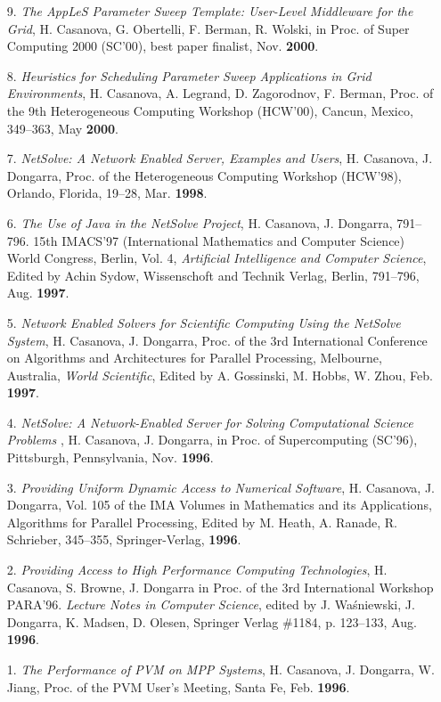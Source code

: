 \begin{enumerate}
\item[9.]
{\it The AppLeS Parameter Sweep Template: User-Level Middleware for the
Grid}, H. Casanova, G. Obertelli, F. Berman, R. Wolski, in Proc.
of Super Computing 2000 (SC'00), best paper finalist, Nov. {\bf 2000}.

\item [8.]
{\it Heuristics for Scheduling Parameter Sweep Applications in Grid
Environments}, H. Casanova, A. Legrand, D. Zagorodnov, F. Berman,
Proc. of the 9th Heterogeneous Computing Workshop (HCW'00), Cancun,
Mexico, 349--363, May {\bf 2000}.

\item[7.]
{\it NetSolve: A Network Enabled Server, Examples and Users}, H. Casanova,
J. Dongarra, Proc. of the Heterogeneous Computing Workshop (HCW'98),
Orlando, Florida, 19--28, Mar. {\bf 1998}.

\item[6.]
{\it The Use of Java in the NetSolve Project}, H. Casanova, J. Dongarra,
791--796.  15th IMACS'97 (International Mathematics and Computer Science)
World Congress, Berlin, Vol. 4, \emph{Artificial Intelligence and Computer
Science}, Edited by Achin Sydow, Wissenschoft and Technik Verlag, Berlin,
791--796, Aug. {\bf 1997}.

\item[5.]
{\it Network Enabled Solvers for Scientific Computing Using the NetSolve
System}, H. Casanova, J. Dongarra, Proc. of the 3rd International
Conference on Algorithms and Architectures for Parallel Processing,
Melbourne, Australia, \emph{World Scientific}, Edited by A. Gossinski,
M. Hobbs, W. Zhou, Feb. {\bf 1997}.

\item[4.]
{\it NetSolve: A Network-Enabled Server for Solving Computational
Science Problems }, H. Casanova, J. Dongarra, in Proc.
of Supercomputing (SC'96), Pittsburgh, Pennsylvania, Nov. {\bf 1996}.


\item[3.]
{\it Providing Uniform Dynamic Access to Numerical Software}, H. Casanova,
J. Dongarra, Vol. 105 of the IMA Volumes in Mathematics and its
Applications, Algorithms for Parallel Processing, Edited by M. Heath,
A. Ranade, R. Schrieber, 345--355, Springer-Verlag, {\bf 1996}.

\item[2.]
{\it Providing Access to High Performance Computing Technologies},
H. Casanova, S. Browne, J. Dongarra in Proc. of the 3rd
International Workshop PARA'96. \emph{Lecture Notes in Computer Science},
edited by J. Wa\'sniewski, J. Dongarra, K. Madsen, D. Olesen, Springer
Verlag \#1184, p. 123--133, Aug. {\bf 1996}.

\item[1.]
{\it The Performance of PVM on MPP Systems}, H. Casanova, J. Dongarra,
W. Jiang, Proc. of the PVM User's Meeting, Santa Fe, Feb.
{\bf 1996}.

\end{enumerate}

